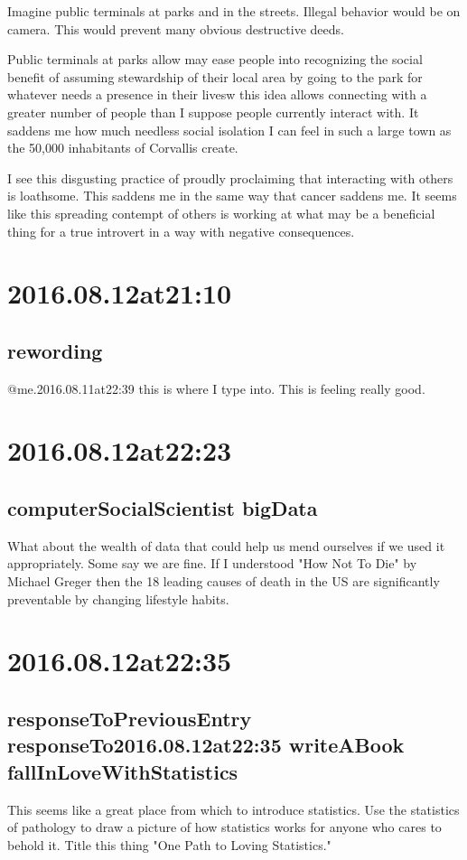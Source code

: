 \begin{enumerate}
\begin{enumerate}
Imagine public terminals at parks and in the streets. Illegal behavior would be on camera. This would prevent many obvious destructive deeds.

Public terminals at parks allow may ease people into recognizing the social benefit of assuming stewardship of their local area by going to the park for whatever needs a presence in their livesw this idea allows connecting with a greater number of people than I suppose people currently interact with. It saddens me how much needless social isolation I can feel in such a large town as the 50,000 inhabitants of Corvallis create.

I see this disgusting practice of proudly proclaiming that interacting with others is loathsome. This saddens me in the same way that cancer saddens me. It seems like this spreading contempt of others is working at what may be a beneficial thing for a true introvert in a way with negative consequences.

\section*{ 2016.08.12at21:10 }
\subsection*{rewording}
@me.2016.08.11at22:39
this is where I type into. This is feeling really good.

\section*{ 2016.08.12at22:23 }
\subsection*{computerSocialScientist bigData}
What about the wealth of data that could help us mend ourselves if we used it appropriately. Some say we are fine. If I understood "How Not To Die" by Michael Greger then the 18 leading causes of death in the US are significantly preventable by changing lifestyle habits.

\section*{ 2016.08.12at22:35 }
\subsection*{responseToPreviousEntry responseTo2016.08.12at22:35 writeABook fallInLoveWithStatistics}
This seems like a great place from which to introduce statistics. Use the statistics of pathology to draw a picture of how statistics works for anyone who cares to behold it. Title this thing "One Path to Loving Statistics."


\end{enumerate}
\end{enumerate}
